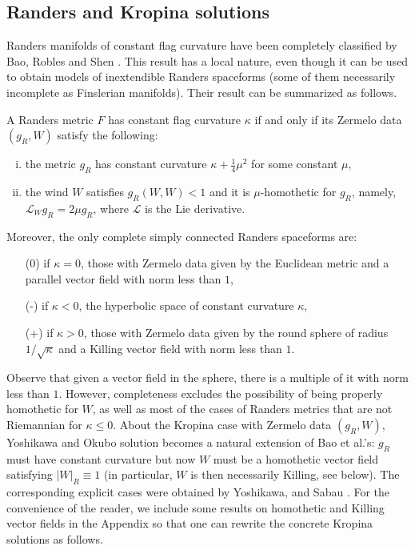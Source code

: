 \documentclass[reqno,10pt]{amsart}
\begin{document}
\subsection{Randers and Kropina solutions} \label{s3.1}
 Randers manifolds of constant flag curvature have been completely classified by   Bao, Robles and Shen  \cite[Th. 3.1]{BRS}. This result has a local nature, even though it can be used to obtain models of inextendible Randers spaceforms (some of them  necessarily incomplete  as Finslerian manifolds). Their result can be  summarized as follows.
\begin{thm}\label{tbrs}
A Randers metric $F$ has constant flag curvature $\kappa$ if and only if its Zermelo data $(g_R,W)$  satisfy  the following:
\begin{enumerate}[(i)]
\item the metric $g_R$ has constant curvature $\kappa+\frac{1}{4}\mu^2$ for some constant $\mu$,
\item the wind $W$ satisfies $g_R(W,W)<1$ and it is $\mu$-homothetic for $g_R$, namely, ${\mathcal L}_W g_R=2\mu g_R$, where $\mathcal L$ is the Lie derivative.
\end{enumerate}
Moreover, the only complete simply connected Randers spaceforms are:
\begin{enumerate}
\item[(0)] if $\kappa=0$, those with Zermelo data given by the Euclidean metric and a parallel vector field with norm less than $1$,
\item[(-)] if $\kappa<0$, the hyperbolic space of constant curvature $\kappa$,
\item[(+)] if $\kappa>0$, those with Zermelo data given by the round sphere of radius $1/\sqrt{\kappa}$ and a Killing vector field with norm less than $1$.
\end{enumerate}
\end{thm}
Observe that given a vector field in the sphere, there is a multiple of it with norm less than $1$. However, completeness excludes the possibility of being properly homothetic for $W$, as well as most of the cases of Randers metrics that are not Riemannian for $\kappa\leq 0$.
About the  Kropina case with Zermelo data $(g_R,W)$,  Yoshikawa and Okubo  \cite[Th. 4]{YoOk07} solution becomes a natural extension of Bao et al.'s: $g_R$ must have constant curvature but now $W$ must be a homothetic  vector field satisfying $| W|_R\equiv 1$ (in particular, $W$  is then necessarily Killing,  see below). The corresponding explicit cases were obtained by Yoshikawa, and Sabau  \cite{YoSa}. 
For the convenience of the reader, we include some results on homothetic and Killing vector fields in the Appendix so that one can  rewrite the concrete Kropina solutions \cite{YoOk07, YoSa} as follows.
\end{document}
